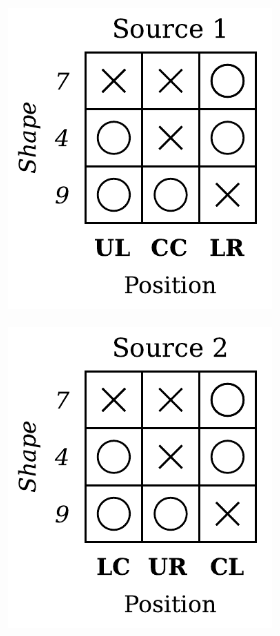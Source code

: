\begin{definition}
\begin{figure}[H]
\begin{subfigure}[b]{0.45\textwidth}
\begin{subfigure}[b]{0.48\textwidth}
                \includegraphics[width=\textwidth]{img/datasets/1-CGO_fact=pos_env=0.pdf}
            \end{subfigure}
            \begin{subfigure}[b]{0.48\textwidth}
                \centering
                \includegraphics[width=\textwidth]{img/datasets/1-CGO_fact=pos_env=1.pdf}

\end{subfigure}
\end{subfigure}
\end{figure}
\end{definition}
